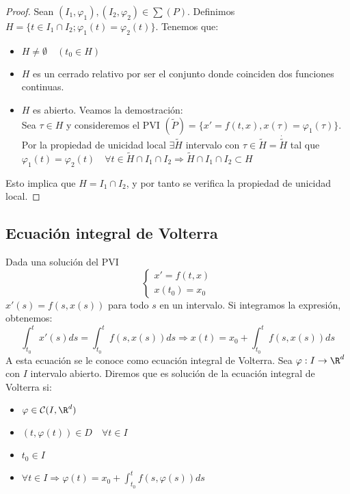 \documentclass{article}
\begin{document}
\begin{proof}
  Sean $(I_1, \varphi_1), (I_2, \varphi_2) \in \sum (P)$. Definimos
  $H = \{ t \in I_1 \cap I_2; \varphi_1(t) = \varphi_2(t)\}$. Tenemos que:
  \begin{itemize}
  \item $H \neq \emptyset \quad (t_0 \in H)$
  \item $H$ es un cerrado relativo por ser el conjunto donde coinciden dos funciones continuas.
  \item $H$ es abierto. Veamos la demostración:\\
    Sea $\tau \in H$ y consideremos el PVI $(\tilde{P})=\{x'= f(t, x), x(\tau) =
    \varphi_1(\tau)\}$. Por la propiedad de unicidad local $\exists \tilde{H}$ intervalo con
    $\tau \in \tilde{H} = \dot{\tilde{H}}$ tal que
    $\varphi_1(t) = \varphi_2(t) \quad \forall t \in \tilde{H} \cap I_1 \cap I_2 \Rightarrow
    \tilde{H} \cap I_1 \cap I_2 \subset H$
  \end{itemize}
  Esto implica que $H = I_1 \cap I_2$, y por tanto se verifica la propiedad de unicidad local.
\end{proof}

\subsection{Ecuación integral de Volterra}

Dada una solución del PVI
\[
  \left\{
    \begin{array}{l}
      x' = f(t,x) \\
      x(t_0) = x_0
    \end{array}
  \right.
\]
$x'(s) = f(s,x(s))$ para todo $s$ en un intervalo. Si integramos la expresión, obtenemos:
$$ \int_{t_0}^t x'(s)ds = \int_{t_0}^tf(s,x(s))ds \Rightarrow x(t) = x_0 + \int_{t_0}^t f(s, x(s))ds $$
A esta ecuación se le conoce como ecuación integral de Volterra. Sea $\varphi: I \to \R^d$ con $I$
intervalo abierto. Diremos que es solución de la ecuación integral de Volterra si:

\begin{itemize}
\item $\varphi \in \mathcal{C}(I, \R^d)$
\item $(t, \varphi(t)) \in D \quad \forall t \in I$
\item $t_0 \in I$
\item $\forall t \in I \Rightarrow \varphi(t) = x_0 + \displaystyle\int_{t_0}^t f(s, \varphi(s))ds$
\end{itemize}
\end{document}
